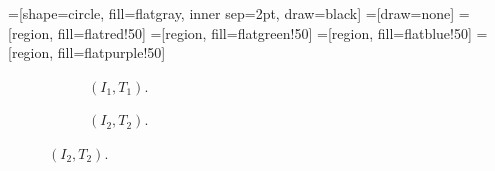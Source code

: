 =[shape=circle, fill=flatgray, inner sep=2pt, draw=black]
=[draw=none]
=[region, fill=flatred!50]
=[region, fill=flatgreen!50]
=[region, fill=flatblue!50]
=[region, fill=flatpurple!50]

\newcommand{\pointgrid}[4]{{
  \newcommand{\argxmin}{#1}
  \newcommand{\argxmax}{#2}
  \newcommand{\argymin}{#3}
  \newcommand{\argymax}{#4}

  \draw[] (\argxmin, 0) to (\argxmax, 0);
  \draw[] (0, \argymin) to (0, \argymax);
  \foreach \x in {\argxmin, ..., \argxmax} {
    \foreach \y in {\argymin, ..., \argymax} {
      \node[point] (\x-\y) at (\x, \y) {};
    }
  }
}}

\begin{figure}[ht]
  \centering

  \newcommand{\subfigwidth}{0.45\columnwidth}
  \newcommand{\subfighspace}{0.3cm}
  \newcommand{\tikzhspace}{0.4cm}
  \newcommand{\tikzscale}{0.5}
  \newcommand{\xmin}{-2}
  \newcommand{\xmax}{2}
  \newcommand{\ymin}{-2}
  \newcommand{\ymax}{2}

  \begin{subfigure}[t]{\subfigwidth}
    \centering
    \caption{$(I_1, T_1)$.}
  \end{subfigure}
  \begin{subfigure}[t]{\subfigwidth}
    \centering
    \caption{$(I_2, T_2)$.}
  \end{subfigure}

  \vspace{12pt}


\end{figure}
